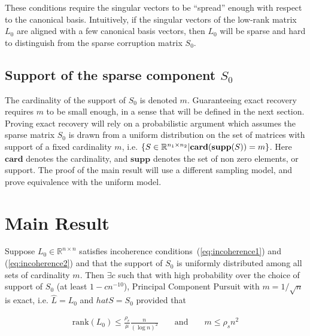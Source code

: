 These conditions require the singular vectors to be ``spread'' enough with respect to the canonical basis. Intuitively, if the singular vectors of the low-rank matrix $L_0$ are aligned with a few canonical basis vectors, then $L_0$ will be sparse and hard to distinguish from the sparse corruption matrix $S_0$.



\subsection{Support of the sparse component $S_0$}
The cardinality of the support of $S_0$ is denoted $m$. Guaranteeing exact recovery requires $m$ to be small enough, in a sense that will be defined in the next section. Proving exact recovery will rely on a probabilistic argument which assumes the sparse matrix $S_0$ is drawn from a uniform distribution on the set of matrices with support of a fixed cardinality $m$, i.e. $\{ S \in {\mathbb R}^{n_1 \times n_2} | \mathbf{card}(\mathbf{supp}(S)) = m \}$. Here $\mathbf{card}$ denotes the cardinality, and $\mathbf{supp}$ denotes the set of non zero elements, or support. The proof of the main result will use a different sampling model, and prove equivalence with the uniform model.


\section{Main Result}
\begin{theorem}
\label{thm:pcp}
Suppose $L_0 \in \mathbb{R}^{n \times n}$ satisfies incoherence conditions~(\ref{eq:incoherence1}) and (\ref{eq:incoherence2}) and that the support of $S_0$ is uniformly distributed among all sets of cardinality $m$. Then $\exists c$ such that with high probability over the choice of support of $S_0$ (at least $1-cn^{-10}$), Principal Component Pursuit with $m = 1/\sqrt{n}$ is exact, i.e. $\hat{L} = L_0$ and $hat{S} = S_0$ provided that

\begin{equation}
\begin{aligned}
\text{rank}(L_0) \leq \frac{\rho_r}{\mu} \frac{n}{(\log n)^2} && \text{ and } && m \leq \rho_s n^2
\end{aligned}
\end{equation}

\end{theorem}

